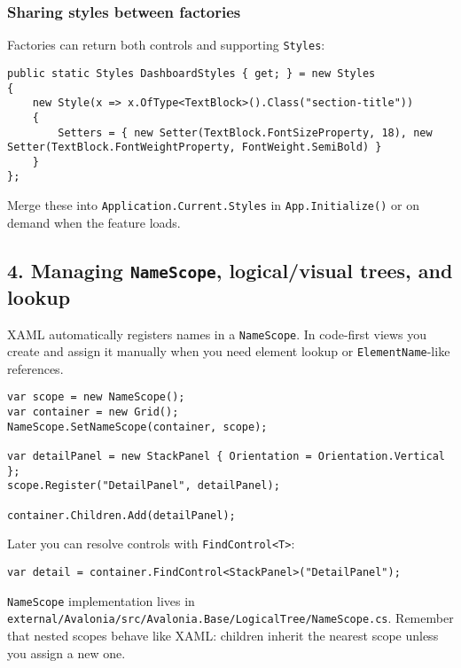\subsubsection{Sharing styles between
factories}\label{sharing-styles-between-factories}

Factories can return both controls and supporting
\passthrough{\lstinline!Styles!}:

\begin{lstlisting}
public static Styles DashboardStyles { get; } = new Styles
{
    new Style(x => x.OfType<TextBlock>().Class("section-title"))
    {
        Setters = { new Setter(TextBlock.FontSizeProperty, 18), new Setter(TextBlock.FontWeightProperty, FontWeight.SemiBold) }
    }
};
\end{lstlisting}

Merge these into \passthrough{\lstinline!Application.Current.Styles!} in
\passthrough{\lstinline!App.Initialize()!} or on demand when the feature
loads.

\subsection{\texorpdfstring{4. Managing \texttt{NameScope},
logical/visual trees, and
lookup}{4. Managing NameScope, logical/visual trees, and lookup}}\label{managing-namescope-logicalvisual-trees-and-lookup}

XAML automatically registers names in a
\passthrough{\lstinline!NameScope!}. In code-first views you create and
assign it manually when you need element lookup or
\passthrough{\lstinline!ElementName!}-like references.

\begin{lstlisting}
var scope = new NameScope();
var container = new Grid();
NameScope.SetNameScope(container, scope);

var detailPanel = new StackPanel { Orientation = Orientation.Vertical };
scope.Register("DetailPanel", detailPanel);

container.Children.Add(detailPanel);
\end{lstlisting}

Later you can resolve controls with
\passthrough{\lstinline!FindControl<T>!}:

\begin{lstlisting}
var detail = container.FindControl<StackPanel>("DetailPanel");
\end{lstlisting}

\passthrough{\lstinline!NameScope!} implementation lives in
\passthrough{\lstinline!external/Avalonia/src/Avalonia.Base/LogicalTree/NameScope.cs!}.
Remember that nested scopes behave like XAML: children inherit the
nearest scope unless you assign a new one.

